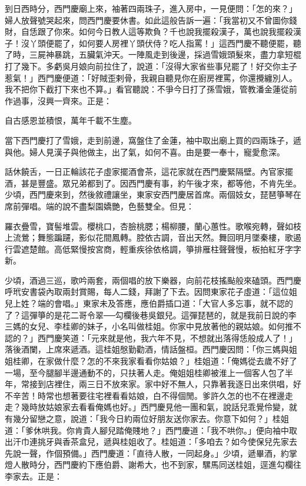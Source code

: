 \begin{showcontents}{}
到日西時分，西門慶廟上來，袖著四兩珠子，進入房中，一見便問：「怎的來？」婦人放聲號哭起來，問西門慶要休書。如此這般告訴一遍：「我當初又不曾圖你錢財，自恁跟了你來。如何今日教人這等欺負？千也說我擺殺漢子，萬也說我擺殺漢子！沒丫頭便罷了，如何要人房裡丫頭伏侍？吃人指罵！」這西門慶不聽便罷，聽了時，三屍神暴跳，五臟氣沖天。一陣風走到後邊，採過雪娥頭髮來，盡力拿短棍打了幾下。多虧吳月娘向前拉住了，說道：「沒得大家省些事兒罷了！好交你主子惹氣！」西門慶便道：「好賊歪剌骨，我親自聽見你在廚房裡罵，你還攪纏別人。我不把你下截打下來也不算。」看官聽說：不爭今日打了孫雪娥，管教潘金蓮從前作過事，沒興一齊來。正是：

自古感恩並積恨，萬年千載不生塵。

當下西門慶打了雪娥，走到前邊，窩盤住了金蓮，袖中取出廟上買的四兩珠子，遞與他。婦人見漢子與他做主，出了氣，如何不喜。由是要一奉十，寵愛愈深。

話休饒舌，一日正輪該花子虛家擺酒會茶，這花家就在西門慶緊隔壁。內官家擺酒，甚是豐盛。眾兄弟都到了。因西門慶有事，約午後才來，都等他，不肯先坐。少頃，西門慶來到，然後敘禮讓坐，東家安西門慶居首席。兩個妓女，琵琶箏琴在席前彈唱。端的說不盡梨園嬌艷，色藝雙全。但見：

羅衣疊雪，寶髻堆雲。櫻桃口，杏臉桃腮；楊柳腰，蘭心蕙性。歌喉宛轉，聲如枝上流鶯；舞態蹁躚，影似花間鳳轉。腔依古調，音出天然。舞回明月墜秦樓，歌遏行雲遮楚館。高低緊慢按宮商，輕重疾徐依格調，箏排雁柱聲聲慢，板拍紅牙字字新。

少頃，酒過三巡，歌吟兩套，兩個唱的放下樂器，向前花枝搖颭般來磕頭。西門慶呼玳安書袋內取兩封賞賜，每人二錢，拜謝了下去。因問東家花子虛道：「這位姐兒上姓？端的會唱。」東家未及答應，應伯爵插口道：「大官人多忘事，就不認的了？這彈箏的是花二哥令翠──勾欄後巷吳銀兒。這彈琵琶的，就是我前日說的李三媽的女兒、李桂卿的妹子，小名叫做桂姐。你家中見放著他的親姑娘。如何推不認的？」西門慶笑道：「元來就是他，我六年不見，不想就出落得恁般成人了！」 落後酒闌，上席來遞酒。這桂姐慇勤勸酒，情話盤桓。西門慶因問：「你三媽與姐姐桂卿，在家做什麼？怎的不來我家看看你姑娘？」桂姐道：「俺媽從去歲不好了一場，至今腿腳半邊通動不的，只扶著人走。俺姐姐桂卿被淮上一個客人包了半年，常接到店裡住，兩三日不放來家。家中好不無人，只靠著我逐日出來供唱，好不辛苦！時常也想著要往宅裡看看姑娘，白不得個閒。爹許久怎的也不在裡邊走走？幾時放姑娘家去看看俺媽也好。」西門慶見他一團和氣，說話兒乖覺伶變，就有幾分留戀之意，說道：「我今日約兩位好朋友送你家去。你意下如何？」桂姐道：「爹休哄我。你肯貴人腳兒踏俺賤地？」西門慶道：「我不哄你。」便向袖中取出汗巾連挑牙與香茶盒兒，遞與桂姐收了。桂姐道：「多咱去？如今使保兒先家去先說一聲，作個預備。」西門慶道：「直待人散，一同起身。」少頃，遞畢酒，約掌燈人散時分，西門慶約下應伯爵、謝希大，也不到家，騾馬同送桂姐，逕進勾欄往李家去。正是：


\end{showcontents}
